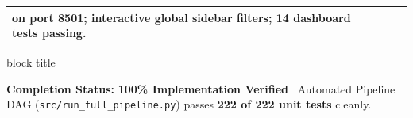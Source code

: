 \documentclass[aspectratio=169, 10pt]{beamer}
\newenvironment{highlightcard}[1][]{%
        \begin{beamercolorbox}[rounded=true,shadow=false,wd=\linewidth,sep=3.5pt,#1]{block title}%
        \fontsize{7.8pt}{9.8pt}\selectfont%
    }{%
        \end{beamercolorbox}%
    }
\begin{document}
\begin{frame}[t]
\begin{table}[h]
\begin{tabular}{p{2.3cm}p{7.2cm}p{3.5cm}}
  on port 8501; interactive global sidebar filters; 14 dashboard tests passing. \\                                                                                                                     
                \bottomrule                                                                                                                                                                            
            \end{tabular}                                                                                                                                                                              
        \end{table}                                                                                                                                                                                    
        \vspace{-0.15cm}                                                                                                                                                                               
        \begin{highlightcard}                                                                                                                                                                          
            \centering\scriptsize                                                                                                                                                                      
            \textbf{Completion Status:} \textcolor{GreenAccent}{\textbf{100\% Implementation Verified}} \textbullet\ Automated Pipeline DAG (\texttt{src/run_full_pipeline.py}) passes \textbf{222 of  
  222 unit tests} cleanly.                                                                                                                                                                             
        \end{highlightcard}                                                                                                                                                                            
    \end{frame}                                                                                                                                                                                        
                                                                                                                                                                                                       
\end{document}
